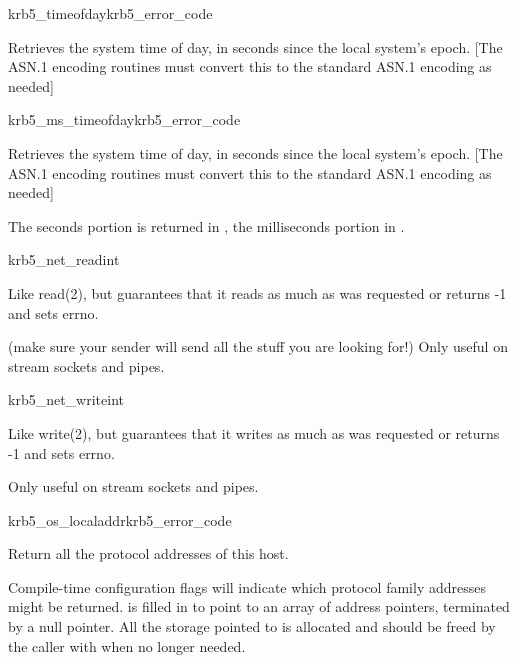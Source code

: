 \begin{funcdecl}{krb5_timeofday}{krb5_error_code}{\funcout}
\end{funcdecl}

Retrieves the system time of day, in seconds since the local system's
epoch.
[The ASN.1 encoding routines must convert this to the standard ASN.1
encoding as needed]

\begin{funcdecl}{krb5_ms_timeofday}{krb5_error_code}{\funcout}
\end{funcdecl}

Retrieves the system time of day, in seconds since the local system's
epoch.
[The ASN.1 encoding routines must convert this to the standard ASN.1
encoding as needed]

The seconds portion is returned in , the
milliseconds portion in .

\begin{funcdecl}{krb5_net_read}{int}{\funcin}
\funcout
{}
\funcin
{}
\end{funcdecl}

Like read(2), but guarantees that it reads as much as was requested
or returns -1 and sets errno.

(make sure your sender will send all the stuff you are looking for!)
Only useful on stream sockets and pipes.

\begin{funcdecl}{krb5_net_write}{int}{\funcin}
\end{funcdecl}

Like write(2), but guarantees that it writes as much as was requested
or returns -1 and sets errno.

Only useful on stream sockets and pipes.

\begin{funcdecl}{krb5_os_localaddr}{krb5_error_code}{\funcout}
\end{funcdecl}

Return all the protocol addresses of this host.

Compile-time configuration flags will indicate which protocol family
addresses might be returned.
 is filled in to point to an array of address pointers,
terminated by a null pointer.  All the storage pointed to is allocated
and should be freed by the caller with 
when no longer needed.


